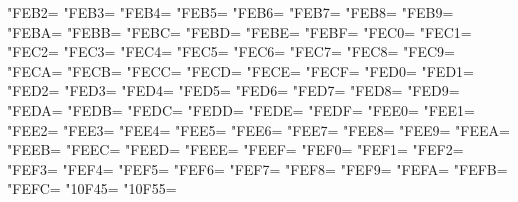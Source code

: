 \XeTeXcharclass"FEB2=\KclassArabU
\XeTeXcharclass"FEB3=\KclassArabU
\XeTeXcharclass"FEB4=\KclassArabU
\XeTeXcharclass"FEB5=\KclassArabU
\XeTeXcharclass"FEB6=\KclassArabU
\XeTeXcharclass"FEB7=\KclassArabU
\XeTeXcharclass"FEB8=\KclassArabU
\XeTeXcharclass"FEB9=\KclassArabU
\XeTeXcharclass"FEBA=\KclassArabU
\XeTeXcharclass"FEBB=\KclassArabU
\XeTeXcharclass"FEBC=\KclassArabU
\XeTeXcharclass"FEBD=\KclassArabU
\XeTeXcharclass"FEBE=\KclassArabU
\XeTeXcharclass"FEBF=\KclassArabU
\XeTeXcharclass"FEC0=\KclassArabU
\XeTeXcharclass"FEC1=\KclassArabU
\XeTeXcharclass"FEC2=\KclassArabU
\XeTeXcharclass"FEC3=\KclassArabU
\XeTeXcharclass"FEC4=\KclassArabU
\XeTeXcharclass"FEC5=\KclassArabU
\XeTeXcharclass"FEC6=\KclassArabU
\XeTeXcharclass"FEC7=\KclassArabU
\XeTeXcharclass"FEC8=\KclassArabU
\XeTeXcharclass"FEC9=\KclassArabU
\XeTeXcharclass"FECA=\KclassArabU
\XeTeXcharclass"FECB=\KclassArabU
\XeTeXcharclass"FECC=\KclassArabU
\XeTeXcharclass"FECD=\KclassArabU
\XeTeXcharclass"FECE=\KclassArabU
\XeTeXcharclass"FECF=\KclassArabU
\XeTeXcharclass"FED0=\KclassArabU
\XeTeXcharclass"FED1=\KclassArabU
\XeTeXcharclass"FED2=\KclassArabU
\XeTeXcharclass"FED3=\KclassArabU
\XeTeXcharclass"FED4=\KclassArabU
\XeTeXcharclass"FED5=\KclassArabU
\XeTeXcharclass"FED6=\KclassArabU
\XeTeXcharclass"FED7=\KclassArabU
\XeTeXcharclass"FED8=\KclassArabU
\XeTeXcharclass"FED9=\KclassArabU
\XeTeXcharclass"FEDA=\KclassArabU
\XeTeXcharclass"FEDB=\KclassArabU
\XeTeXcharclass"FEDC=\KclassArabU
\XeTeXcharclass"FEDD=\KclassArabU
\XeTeXcharclass"FEDE=\KclassArabU
\XeTeXcharclass"FEDF=\KclassArabU
\XeTeXcharclass"FEE0=\KclassArabU
\XeTeXcharclass"FEE1=\KclassArabU
\XeTeXcharclass"FEE2=\KclassArabU
\XeTeXcharclass"FEE3=\KclassArabU
\XeTeXcharclass"FEE4=\KclassArabU
\XeTeXcharclass"FEE5=\KclassArabU
\XeTeXcharclass"FEE6=\KclassArabU
\XeTeXcharclass"FEE7=\KclassArabU
\XeTeXcharclass"FEE8=\KclassArabU
\XeTeXcharclass"FEE9=\KclassArabU
\XeTeXcharclass"FEEA=\KclassArabU
\XeTeXcharclass"FEEB=\KclassArabU
\XeTeXcharclass"FEEC=\KclassArabU
\XeTeXcharclass"FEED=\KclassArabU
\XeTeXcharclass"FEEE=\KclassArabU
\XeTeXcharclass"FEEF=\KclassArabU
\XeTeXcharclass"FEF0=\KclassArabU
\XeTeXcharclass"FEF1=\KclassArabU
\XeTeXcharclass"FEF2=\KclassArabU
\XeTeXcharclass"FEF3=\KclassArabU
\XeTeXcharclass"FEF4=\KclassArabU
\XeTeXcharclass"FEF5=\KclassArabU
\XeTeXcharclass"FEF6=\KclassArabU
\XeTeXcharclass"FEF7=\KclassArabU
\XeTeXcharclass"FEF8=\KclassArabU
\XeTeXcharclass"FEF9=\KclassArabU
\XeTeXcharclass"FEFA=\KclassArabU
\XeTeXcharclass"FEFB=\KclassArabU
\XeTeXcharclass"FEFC=\KclassArabU
\XeTeXcharclass"10F45=\KclassArabU
\XeTeXcharclass"10F55=\KclassArabU
